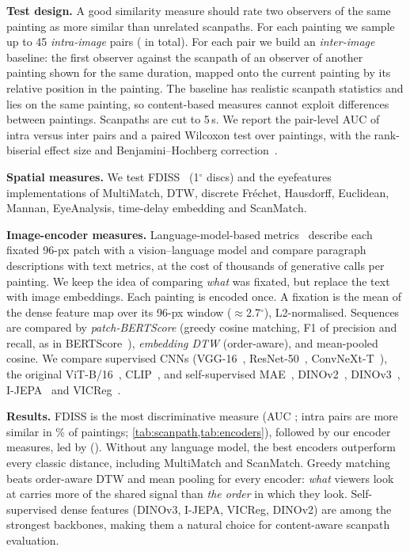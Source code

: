 \documentclass[10pt,twocolumn,letterpaper]{article}
\newcommand{\dg}{\ensuremath{^\circ}}
\newcommand{\mypara}[1]{\vspace{2pt}\noindent\textbf{#1}\hspace{0.5em}}
\begin{document}
\mypara{Test design.} A good similarity measure should rate two observers of the same painting as more similar than
unrelated scanpaths. For each painting we sample up to 45 \emph{intra-image} pairs (\nIntraPairs{} in total). For each
pair we build an \emph{inter-image} baseline: the first observer against the scanpath of an observer of another
painting shown for the same duration, mapped onto the current painting by its relative position in the painting. The
baseline has realistic scanpath statistics and lies on the same painting, so content-based measures cannot exploit
differences between paintings. Scanpaths are cut to 5\,s. We report the pair-level AUC of intra versus inter pairs and
a paired Wilcoxon test over paintings, with the rank-biserial effect size and Benjamini--Hochberg
correction~\cite{benjamini1995fdr}.

\mypara{Spatial measures.} We test FDISS~\cite{kerkouri2026fdiss} (1\dg{} discs) and the eyefeatures~\cite{eyefeatures}
implementations of MultiMatch, DTW, discrete Fr\'echet, Hausdorff, Euclidean, Mannan, EyeAnalysis, time-delay embedding
and ScanMatch.

\mypara{Image-encoder measures.} Language-model-based metrics~\cite{kerkouri2026whatsaw,scanpathnlp} describe each fixated 96-px patch with
a vision--language model and compare paragraph descriptions with text metrics, at the cost of thousands of generative
calls per painting. We keep the idea of comparing \emph{what} was fixated, but replace the text with image embeddings.
Each painting is encoded once. A fixation is the mean of the dense feature map over its 96-px window ($\approx$2.7\dg),
L2-normalised. Sequences are compared by \emph{patch-BERTScore} (greedy cosine matching, F1 of precision and recall, as
in BERTScore~\cite{zhang2020bertscore}), \emph{embedding DTW} (order-aware), and mean-pooled cosine. We compare
supervised CNNs (VGG-16~\cite{simonyan2015vgg}, ResNet-50~\cite{he2016resnet}, ConvNeXt-T~\cite{liu2022convnext}),
the original ViT-B/16~\cite{dosovitskiy2021vit}, CLIP~\cite{radford2021clip}, and self-supervised MAE~\cite{he2022mae},
DINOv2~\cite{oquab2024dinov2}, DINOv3~\cite{simeoni2025dinov3}, I-JEPA~\cite{assran2023ijepa} and
VICReg~\cite{bardes2022vicreg}.

\mypara{Results.} FDISS is the most discriminative measure (AUC \fdissAUC; intra pairs are more similar in
\fdissPct\% of paintings; \cref{tab:scanpath,tab:encoders}), followed by our encoder measures, led by
\bestEncoderLabel{} (\bestEncoderAUC). Without any language model, the best encoders outperform every classic distance,
including MultiMatch and ScanMatch. Greedy matching beats order-aware DTW and mean pooling for every encoder:
\emph{what} viewers look at carries more of the shared signal than \emph{the order} in which they look.
Self-supervised dense features (DINOv3, I-JEPA, VICReg, DINOv2) are among the strongest backbones, making them a
natural choice for content-aware scanpath evaluation.
\end{document}
